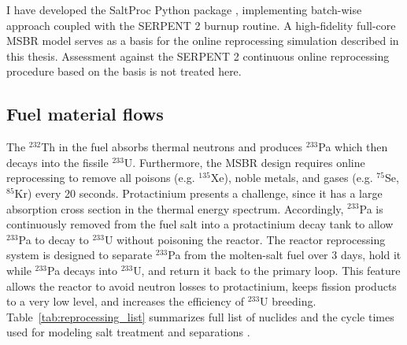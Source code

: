 I have developed the SaltProc Python package \cite{andrei_rykhlevskii_arfc/saltproc:_2018}, implementing batch-wise approach coupled with the SERPENT 2 burnup routine. A high-fidelity full-core \gls{MSBR} model serves as a basis for the online reprocessing simulation described in this thesis. Assessment against the SERPENT 2 continuous online reprocessing procedure based on the basis is not treated here.

\subsection{Fuel material flows}
The $^{232}$Th in the fuel absorbs thermal neutrons and produces $^{233}$Pa which then decays into the fissile $^{233}$U. Furthermore, the \gls{MSBR} design requires online reprocessing to remove all poisons (e.g. $^{135}$Xe), noble metals, and gases (e.g. $^{75}$Se, $^{85}$Kr) every 20 seconds. Protactinium presents a challenge, since it has a large absorption cross section in the thermal energy spectrum. Accordingly, $^{233}$Pa is continuously removed from the fuel salt into a protactinium decay tank to allow $^{233}$Pa to decay to $^{233}$U without poisoning the reactor. The reactor reprocessing system is designed to separate $^{233}$Pa from the molten-salt fuel over 3 days, hold it while $^{233}$Pa decays into $^{233}$U, and return it back to the primary loop. This feature allows the reactor to avoid neutron losses to protactinium, keeps fission products to a very low level, and increases the efficiency of $^{233}$U breeding. Table~\ref{tab:reprocessing_list} summarizes full list of nuclides and the cycle times used for modeling salt treatment and separations \cite{robertson_conceptual_1971}. 

